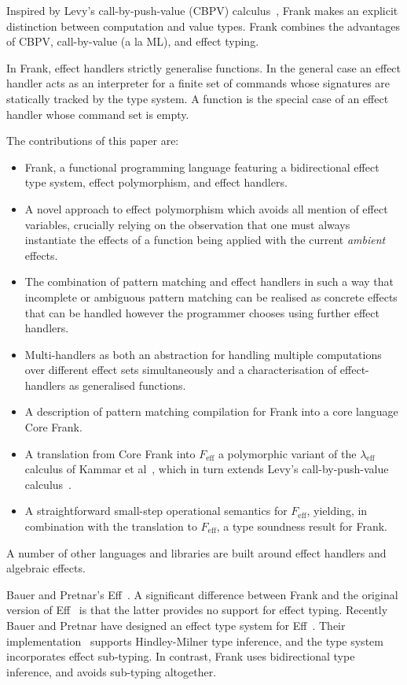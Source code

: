 \documentclass[preprint]{sigplanconf}
\newcommand{\lameff}{$\lambda_\mathrm{eff}$\xspace}
\newcommand{\feff}{$F_\textrm{eff}$\xspace}
\begin{document}
Inspired by Levy's call-by-push-value (CBPV) calculus~\cite{Levy2004},
Frank makes an explicit distinction between computation and value
types. Frank combines the advantages of CBPV, call-by-value (a la ML),
and effect typing.

In Frank, effect handlers strictly generalise functions. In the
general case an effect handler acts as an interpreter for a finite set
of commands whose signatures are statically tracked by the type
system. A function is the special case of an effect handler whose
command set is empty.

The contributions of this paper are:
\begin{itemize}
\item Frank, a functional programming language featuring a
  bidirectional effect type system, effect polymorphism, and effect
  handlers.
\item A novel approach to effect polymorphism which avoids all mention
  of effect variables, crucially relying on the observation that one
  must always instantiate the effects of a function being applied with
  the current \emph{ambient} effects.
\item The combination of pattern matching and effect handlers in such
  a way that incomplete or ambiguous pattern matching can be realised
  as concrete effects that can be handled however the programmer
  chooses using further effect handlers.
\item Multi-handlers as both an abstraction for handling multiple
  computations over different effect sets simultaneously and a
  characterisation of effect-handlers as generalised functions.
\item A description of pattern matching compilation for Frank into a
  core language Core Frank.
\item A translation from Core Frank into \feff a polymorphic variant
  of the \lameff calculus of Kammar et al~\cite{KammarLO13}, which in
  turn extends Levy's call-by-push-value calculus~\cite{Levy2004}.
\item A straightforward small-step operational semantics for \feff,
  yielding, in combination with the translation to \feff, a type
  soundness result for Frank.
\end{itemize}

A number of other languages and libraries are built around effect
handlers and algebraic effects.

Bauer and Pretnar's Eff~\cite{BauerP12}. A significant difference
between Frank and the original version of Eff~\cite{BauerP12} is that
the latter provides no support for effect typing. Recently Bauer and
Pretnar have designed an effect type system for
Eff~\cite{BauerP13}. Their implementation~\cite{Pretnar13} supports
Hindley-Milner type inference, and the type system incorporates effect
sub-typing. In contrast, Frank uses bidirectional type inference, and
avoids sub-typing altogether.
\end{document}
